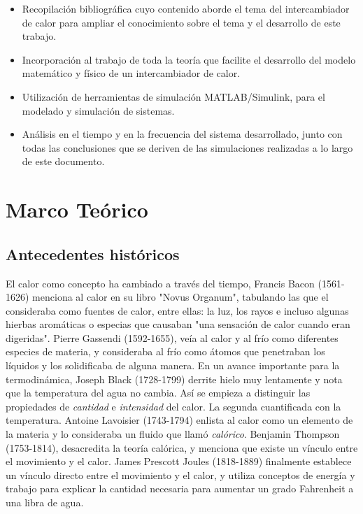 \documentclass[12pt,letterpaper]{article}     %
\begin{document}
\begin{itemize}

\item Recopilación bibliográfica cuyo contenido aborde el tema del intercambiador de calor para ampliar el conocimiento sobre el tema y el desarrollo de este trabajo.
\item Incorporación al trabajo de toda la teoría que facilite el desarrollo del modelo matemático y físico de un intercambiador de calor. 
\item Utilización de herramientas de simulación MATLAB/Simulink, para el modelado y simulación de sistemas.
\item Análisis en el tiempo y en la frecuencia del sistema desarrollado, junto con todas las conclusiones que se deriven de las simulaciones realizadas a lo largo de este documento.
 
 \end{itemize}



\newpage

\section{Marco Teórico}

\subsection{Antecedentes históricos}
El calor como concepto ha cambiado a través del tiempo, Francis Bacon (1561-1626) menciona al calor en su libro "Novus Organum", tabulando las que el consideraba como fuentes de calor, entre ellas: la luz, los rayos e incluso algunas hierbas aromáticas o especias que causaban "una sensación de calor cuando eran digeridas".
Pierre Gassendi (1592-1655), veía al calor y al frío como diferentes especies de materia, y consideraba al frío como átomos que penetraban los líquidos y los solidificaba de alguna manera.
En un avance importante para la termodinámica, Joseph Black (1728-1799) derrite hielo muy lentamente y nota que la temperatura del agua no cambia. Así se empieza a distinguir las propiedades de \textit{cantidad} e \textit{intensidad} del calor. La segunda cuantificada con la temperatura. 
Antoine Lavoisier (1743-1794) enlista al calor como un elemento de la materia y lo consideraba un fluido que llamó \textit{calórico}. \cite[p.\ 27]{Cengel}
Benjamin Thompson (1753-1814), desacredita la teoría calórica, y menciona que existe un vínculo entre el movimiento y el calor.
James Prescott Joules (1818-1889) finalmente establece un vínculo directo entre el movimiento y el calor, y utiliza conceptos de energía y trabajo para explicar la cantidad necesaria para aumentar un grado Fahrenheit a una libra de agua.
\end{document}

